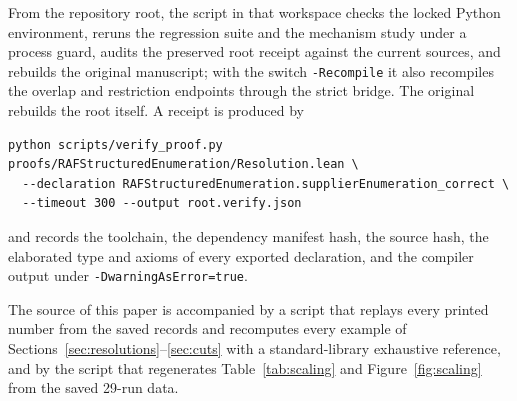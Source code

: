 \documentclass[11pt,a4paper]{article}
\theoremstyle{plain}
\theoremstyle{definition}
\theoremstyle{remark}
\begin{document}
From the repository root, the script  in that workspace checks the locked Python environment, reruns the regression suite and the mechanism study under a process guard, audits the preserved root receipt against the current sources, and rebuilds the original manuscript; with the switch \texttt{-Recompile} it also recompiles the overlap and restriction endpoints through the strict bridge. The original  rebuilds the root itself. A receipt is produced by
\begin{small}\begin{verbatim}
python scripts/verify_proof.py proofs/RAFStructuredEnumeration/Resolution.lean \
  --declaration RAFStructuredEnumeration.supplierEnumeration_correct \
  --timeout 300 --output root.verify.json
\end{verbatim}\end{small}
and records the toolchain, the dependency manifest hash, the source hash, the elaborated type and axioms of every exported declaration, and the compiler output under \texttt{-DwarningAsError=true}.

The source of this paper is accompanied by a script that replays every printed number from the saved records and recomputes every example of Sections~\ref{sec:resolutions}--\ref{sec:cuts} with a standard-library exhaustive reference, and by the script that regenerates Table~\ref{tab:scaling} and Figure~\ref{fig:scaling} from the saved 29-run data.



\end{document}
